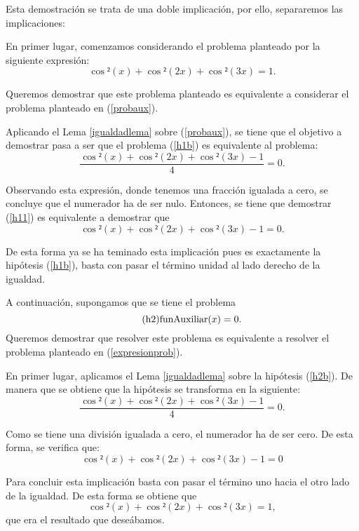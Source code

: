 \begin{demostracion}
  Esta demostración se trata de una doble implicación, por ello,
  separaremos las implicaciones:

  \noindent
  \framebox{\longrightarrow}
  En primer lugar, comenzamos considerando el problema planteado
  por la siguiente expresión:
  \begin{equation}\label{h1b}\tag{h1}
    \cos²(x) + \cos²(2x) + \cos²(3x) = 1.
  \end{equation}

  Queremos demostrar que este problema planteado es equivalente a
  considerar el problema planteado en (\ref{probaux}).

  Aplicando el Lema \ref{igualdadlema} sobre (\ref{probaux}), se tiene
  que el objetivo a demostrar pasa a ser que el problema (\ref{h1b}) es
  equivalente al problema:
  \begin{equation}\label{h11}
    \frac{\cos²(x) + \cos²(2x) + \cos²(3x) - 1}{4} = 0.
  \end{equation}

  Observando esta expresión, donde tenemos una fracción igualada a cero,
  se concluye que el numerador ha de ser nulo. Entonces, se tiene que
  demostrar (\ref{h11}) es equivalente a demostrar que
  \begin{equation}
    \cos²(x) + \cos²(2x) + \cos²(3x) - 1 = 0.
  \end{equation}

  De esta forma ya se ha teminado esta implicación pues es exactamente
  la hipótesis (\ref{h1b}), basta con pasar el término unidad al lado
  derecho de la igualdad.

  \noindent
  \framebox{\longleftarrow} A continuación, supongamos que se tiene
  el problema
  \begin{equation}\label{h2b}\tag{h2}
    \mbox{\rm funAuxiliar}(x) = 0.
  \end{equation}
  Queremos demostrar que resolver este problema es equivalente a
  resolver el problema planteado en (\ref{expresionprob}).

  En primer lugar, aplicamos el Lema \ref{igualdadlema} sobre la
  hipótesis (\ref{h2b}). De manera que se obtiene que la hipótesis
  se transforma en la siguiente:
  \begin{equation}
    \frac{\cos²(x) + \cos²(2x) + \cos²(3x) - 1}{4} = 0.
  \end{equation}

  Como se tiene una división igualada a cero, el numerador ha de ser
  cero. De esta forma, se verifica que:
  \begin{equation}
    \cos²(x) + \cos²(2x) + \cos²(3x) - 1 =0
  \end{equation}

  Para concluir esta implicación basta con pasar el término uno
  hacia el otro lado de la igualdad. De esta forma se obtiene que
  \begin{equation}
    \cos²(x) + \cos²(2x) + \cos²(3x) = 1,
  \end{equation}
  que era el resultado que deseábamos.
\end{demostracion}

